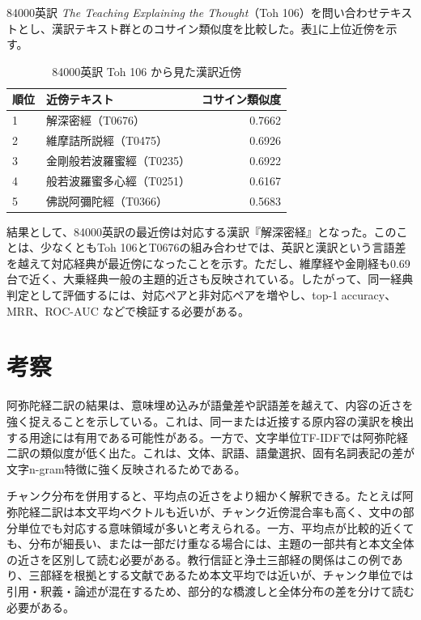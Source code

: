 \documentclass[uplatex,dvipdfmx,11pt,a4paper]{jsarticle}
\begin{document}
84000英訳 \textit{The Teaching Explaining the Thought}（Toh 106）を問い合わせテキストとし、漢訳テキスト群とのコサイン類似度を比較した。表\ref{tab:multilingual-pilot}に上位近傍を示す。

\begin{table}[H]
\centering
\caption{84000英訳 Toh 106 から見た漢訳近傍}
\label{tab:multilingual-pilot}
\begin{tabular}{llr}
\toprule
順位 & 近傍テキスト & コサイン類似度 \\
\midrule
1 & 解深密經（T0676） & 0.7662 \\
2 & 維摩詰所説經（T0475） & 0.6926 \\
3 & 金剛般若波羅蜜經（T0235） & 0.6922 \\
4 & 般若波羅蜜多心經（T0251） & 0.6167 \\
5 & 佛説阿彌陀經（T0366） & 0.5683 \\
\bottomrule
\end{tabular}
\end{table}

結果として、84000英訳の最近傍は対応する漢訳『解深密経』となった。このことは、少なくともToh 106とT0676の組み合わせでは、英訳と漢訳という言語差を越えて対応経典が最近傍になったことを示す。ただし、維摩経や金剛経も0.69台で近く、大乗経典一般の主題的近さも反映されている。したがって、同一経典判定として評価するには、対応ペアと非対応ペアを増やし、top-1 accuracy、MRR、ROC-AUC などで検証する必要がある。

\section{考察}

阿弥陀経二訳の結果は、意味埋め込みが語彙差や訳語差を越えて、内容の近さを強く捉えることを示している。これは、同一または近接する原内容の漢訳を検出する用途には有用である可能性がある。一方で、文字単位TF-IDFでは阿弥陀経二訳の類似度が低く出た。これは、文体、訳語、語彙選択、固有名詞表記の差が文字n-gram特徴に強く反映されるためである。

チャンク分布を併用すると、平均点の近さをより細かく解釈できる。たとえば阿弥陀経二訳は本文平均ベクトルも近いが、チャンク近傍混合率も高く、文中の部分単位でも対応する意味領域が多いと考えられる。一方、平均点が比較的近くても、分布が細長い、または一部だけ重なる場合には、主題の一部共有と本文全体の近さを区別して読む必要がある。教行信証と浄土三部経の関係はこの例であり、三部経を根拠とする文献であるため本文平均では近いが、チャンク単位では引用・釈義・論述が混在するため、部分的な橋渡しと全体分布の差を分けて読む必要がある。
\end{document}
